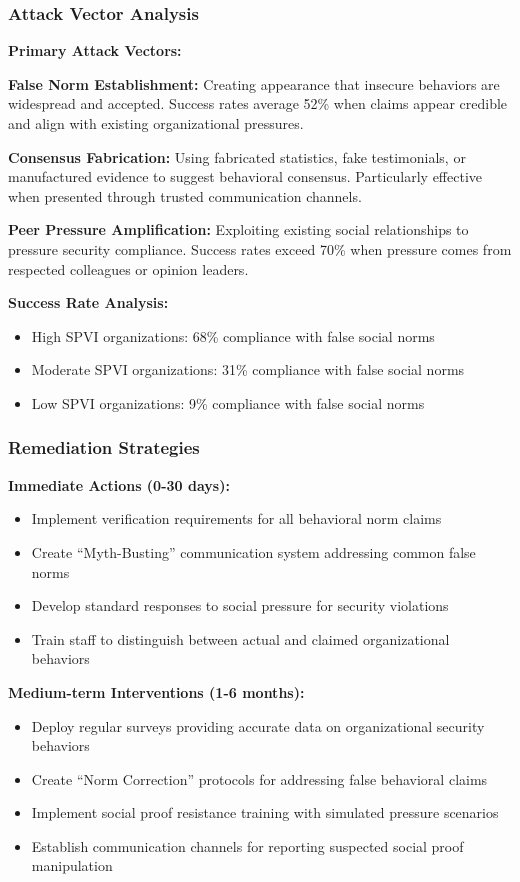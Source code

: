 \documentclass[11pt,a4paper]{article}
\begin{document}
\subsubsection{Attack Vector Analysis}

\textbf{Primary Attack Vectors:}

\textbf{False Norm Establishment:} Creating appearance that insecure behaviors are widespread and accepted. Success rates average 52\% when claims appear credible and align with existing organizational pressures.

\textbf{Consensus Fabrication:} Using fabricated statistics, fake testimonials, or manufactured evidence to suggest behavioral consensus. Particularly effective when presented through trusted communication channels.

\textbf{Peer Pressure Amplification:} Exploiting existing social relationships to pressure security compliance. Success rates exceed 70\% when pressure comes from respected colleagues or opinion leaders.

\textbf{Success Rate Analysis:}
\begin{itemize}
\item High SPVI organizations: 68\% compliance with false social norms
\item Moderate SPVI organizations: 31\% compliance with false social norms
\item Low SPVI organizations: 9\% compliance with false social norms
\end{itemize}

\subsubsection{Remediation Strategies}

\textbf{Immediate Actions (0-30 days):}
\begin{itemize}
\item Implement verification requirements for all behavioral norm claims
\item Create ``Myth-Busting'' communication system addressing common false norms
\item Develop standard responses to social pressure for security violations
\item Train staff to distinguish between actual and claimed organizational behaviors
\end{itemize}

\textbf{Medium-term Interventions (1-6 months):}
\begin{itemize}
\item Deploy regular surveys providing accurate data on organizational security behaviors
\item Create ``Norm Correction'' protocols for addressing false behavioral claims
\item Implement social proof resistance training with simulated pressure scenarios
\item Establish communication channels for reporting suspected social proof manipulation
\end{itemize}
\end{document}
